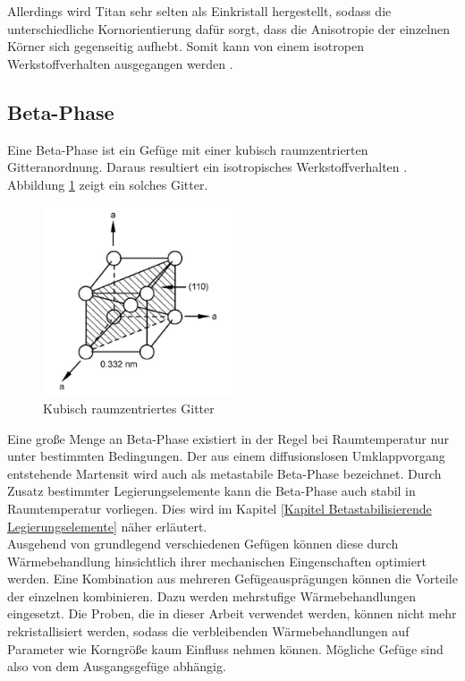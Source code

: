 \documentclass[a4paper, 11pt]{tubsreprt}
\begin{document}
Allerdings wird Titan sehr selten als Einkristall hergestellt, sodass die unterschiedliche Kornorientierung dafür sorgt, dass die Anisotropie der einzelnen Körner sich gegenseitig aufhebt. Somit kann von einem isotropen Werkstoffverhalten ausgegangen werden \cite{Luetjering2007}.


\subsection{Beta-Phase}
Eine Beta-Phase ist ein Gefüge mit einer kubisch raumzentrierten Gitteranordnung. Daraus resultiert ein isotropisches Werkstoffverhalten \cite{Luetjering2007}. Abbildung \ref{Kubischraumzentriertes Gitter} zeigt ein solches Gitter.

\begin{figure}[h]
\centering
\includegraphics[width=0.5\textwidth]{Bilder/KubischraumzentriertesGitter.jpg}
\caption[Kubisch raumzentriertes Gitter]{Kubisch raumzentriertes Gitter \cite{Luetjering2007}}
\label{Kubischraumzentriertes Gitter}
\end{figure}
Eine große Menge an Beta-Phase existiert in der Regel bei Raumtemperatur nur unter bestimmten Bedingungen. Der aus einem diffusionslosen Umklappvorgang entstehende Martensit wird auch als metastabile Beta-Phase bezeichnet. Durch Zusatz bestimmter Legierungselemente kann die Beta-Phase auch stabil in Raumtemperatur vorliegen. Dies wird im Kapitel  \ref{Kapitel Betastabilisierende Legierungselemente} näher erläutert.
\ \\
Ausgehend von grundlegend verschiedenen Gefügen können diese durch Wärmebehandlung hinsichtlich ihrer mechanischen Eingenschaften optimiert werden. Eine Kombination aus mehreren Gefügeausprägungen können die Vorteile der einzelnen kombinieren. Dazu werden mehrstufige Wärmebehandlungen eingesetzt. Die Proben, die in dieser Arbeit verwendet werden, können nicht mehr rekristallisiert werden, sodass die verbleibenden Wärmebehandlungen auf Parameter wie Korngröße kaum Einfluss nehmen können. Mögliche Gefüge sind also von dem Ausgangsgefüge abhängig.  
\newpage
\end{document}
